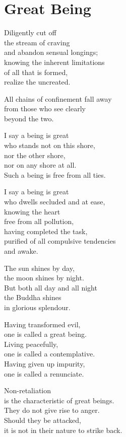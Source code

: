 
\chapter{Great Being}


Diligently cut off\\
the stream of craving\\
and abandon sensual longings;\\
knowing the inherent limitations\\
of all that is formed,\\
realize the uncreated.


All chains of confinement fall away\\
from those who see clearly\\
beyond the two.


I say a being is great\\
who stands not on this shore,\\
nor the other shore,\\
nor on any shore at all.\\
Such a being is free from all ties.


I say a being is great\\
who dwells secluded and at ease,\\
knowing the heart\\
free from all pollution,\\
having completed the task,\\
purified of all compulsive tendencies\\
and awake.


The sun shines by day,\\
the moon shines by night.\\
But both all day and all night\\
the Buddha shines\\
in glorious splendour.


Having transformed evil,\\
one is called a great being.\\
Living peacefully,\\
one is called a contemplative.\\
Having given up impurity,\\
one is called a renunciate.


Non-retaliation\\
is the characteristic of great beings.\\
They do not give rise to anger.\\
Should they be attacked,\\
it is not in their nature to strike back.


